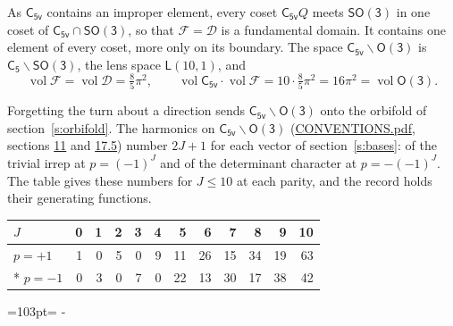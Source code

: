 \documentclass[10pt,a4paper]{article}
\newcommand{\needspace}[1]{\par\penalty-100\begingroup\dimen0=#1\relax\dimen2=\pagegoal
  \advance\dimen2-\pagetotal\ifdim\dimen0>\dimen2\relax\ifdim\dimen2>0pt\vfil\break\fi\fi
  \endgroup}
\numberwithin{equation}{section}
\newcommand{\grp}[1]{\mathsf{#1}}
\newcommand{\vol}{\operatorname{vol}}
\newcommand{\fcell}{\mathcal{D}}
\newcommand{\fdomain}{\mathcal{F}}
\newcommand{\lensspace}[2]{\mathsf{L}(#1, #2)}
\begin{document}
\leavevmode\label{n:set.fundamental}As $\grp{C_{5v}}$ contains an improper element, every coset $\grp{C_{5v}}Q$ meets \href{SO3.pdf}{$\grp{SO(3)}$} in one coset of $\grp{C_{5v}} \cap \grp{SO(3)}$, so that $\fdomain = \fcell$ is a fundamental domain. It contains one element of every coset, more only on its boundary.
\leavevmode\label{n:set.lens}The space $\grp{C_{5v}}\backslash\grp{O(3)}$ is $\grp{C_{5}}\backslash\grp{SO(3)}$, the lens space $\lensspace{10}{1}$, and
\begin{equation}\label{e:volume}\vol\fdomain = \vol\fcell = \tfrac{8}{5}\pi^2,\qquad \vol\grp{C_{5v}}\cdot\vol\fdomain = 10\cdot \tfrac{8}{5}\pi^2 = 16\pi^2 = \vol\grp{O(3)}.\end{equation}

Forgetting the turn about a direction sends $\grp{C_{5v}}\backslash\grp{O(3)}$ onto the orbifold of section~\ref{s:orbifold}.
The harmonics on $\grp{C_{5v}}\backslash\grp{O(3)}$ (\href{../../CONVENTIONS.pdf}{CONVENTIONS.pdf}, sections \href{../../CONVENTIONS.pdf\#conv.11}{11} and \href{../../CONVENTIONS.pdf\#conv.17.5}{17.5}) number $2J + 1$ for each vector of section~\ref{s:bases}: of the trivial irrep at $p = (-1)^J$ and of the determinant character at $p = -(-1)^J$. The table gives these numbers for $J \le 10$ at each parity, and the record holds their generating functions.
{\small\setlength{\tabcolsep}{4pt}\begin{longtable}{@{}lrrrrrrrrrrr@{}}\toprule
$J$ & 0 & 1 & 2 & 3 & 4 & 5 & 6 & 7 & 8 & 9 & 10\\\midrule\endhead
\bottomrule\endfoot\endlastfoot
$p = +1$ & 1 & 0 & 5 & 0 & 9 & 11 & 26 & 15 & 34 & 19 & 63\\*
$p = -1$ & 0 & 3 & 0 & 7 & 0 & 22 & 13 & 30 & 17 & 38 & 42\\
\bottomrule\end{longtable}}
\needspace{103pt}
\end{document}
